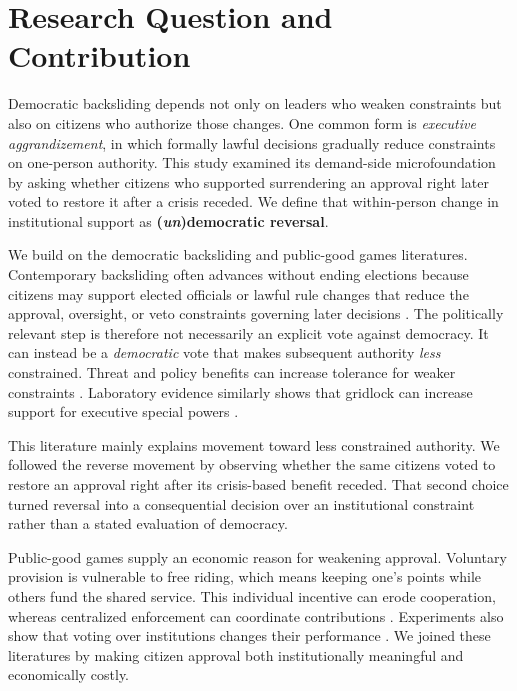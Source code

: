 \documentclass[11pt]{article}
\begin{document}
\clearpage
{}
\setcounter{page}{1}

\section{Research Question and Contribution}

Democratic backsliding depends not only on leaders who weaken constraints but also on citizens who authorize those changes. One common form is \emph{executive aggrandizement}, in which formally lawful decisions gradually reduce constraints on one-person authority. This study examined its demand-side microfoundation by asking whether citizens who supported surrendering an approval right later voted to restore it after a crisis receded. We define that within-person change in institutional support as {\bf (\emph{un})democratic reversal}.

We build on the democratic backsliding and public-good games literatures. Contemporary backsliding often advances without ending elections because citizens may support elected officials or lawful rule changes that reduce the approval, oversight, or veto constraints governing later decisions \parencite{Bermeo2016}. The politically relevant step is therefore not necessarily an explicit vote against democracy. It can instead be a \emph{democratic} vote that makes subsequent authority \emph{less} constrained. Threat and policy benefits can increase tolerance for weaker constraints \parencites{HetheringtonSuhay2011}{Goodman2021}{0b3bf}. Laboratory evidence similarly shows that gridlock can increase support for executive special powers \parencite{FortezaMussioPereyra2024}.

This literature mainly explains movement toward less constrained authority. We followed the reverse movement by observing whether the same citizens voted to restore an approval right after its crisis-based benefit receded. That second choice turned reversal into a consequential decision over an institutional constraint rather than a stated evaluation of democracy.

Public-good games supply an economic reason for weakening approval. Voluntary provision is vulnerable to free riding, which means keeping one's points while others fund the shared service. This individual incentive can erode cooperation, whereas centralized enforcement can coordinate contributions \parencites{FehrGachter2000,FischbacherGachter2010,Hamman2011}. Experiments also show that voting over institutions changes their performance \parencites{DalBo2010,SutterHaignerKocher2010,MarkussenPuttermanTyran2014}. We joined these literatures by making citizen approval both institutionally meaningful and economically costly.
\end{document}
